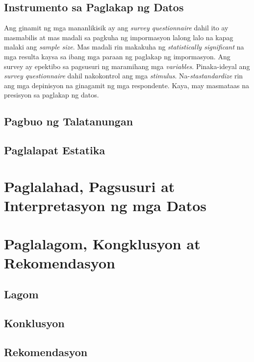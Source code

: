\documentclass [11pt] {report}
\begin{document}
\section{Instrumento sa Paglakap ng Datos}
Ang ginamit ng mga mananlikisik ay ang \emph{survey questionnaire} dahil ito ay
masmabilis at mas madali sa pagkuha ng impormasyon lalong lalo na kapag malaki
ang \emph{sample size}. Mas madali rin makakuha ng \emph{statistically
  significant} na mga resulta kaysa sa ibang mga paraan ng paglakap ng
impormasyon. Ang survey ay epektibo sa pagsusuri ng maramihang mga
\emph{variables}. Pinaka-ideyal ang \emph{survey questionnaire } dahil
nakokontrol ang mga \emph{stimulus}. Na-\emph{stastandardize} rin ang mga
depinisyon na ginagamit ng mga respondente. Kaya, may masmataas na presisyon sa
paglakap ng datos.

\section{Pagbuo ng Talatanungan}
\section{Paglalapat Estatika}

\chapter{Paglalahad, Pagsusuri at Interpretasyon ng mga Datos}
\chapter{Paglalagom, Kongklusyon at Rekomendasyon}
\section{Lagom}
\section{Konklusyon}
\section{Rekomendasyon}



\end{document}

